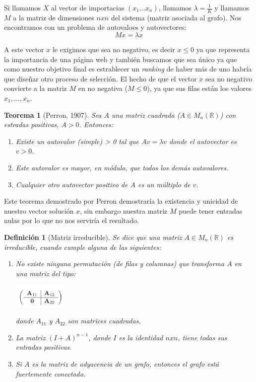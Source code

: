 \documentclass[size=a4, parskip=half, titlepage=false, toc=flat, toc=bib, 12pt]{scrartcl}
\theoremstyle{theorem-style}
\newtheorem{nth}{Teorema}[section]
\theoremstyle{definition-style}
\newtheorem{ndef}{Definición}[section]
\theoremstyle{remark-style}
\theoremstyle{example-style}
\theoremstyle{definition-style}
\theoremstyle{remark-style}
\begin{document}
Si llamamos $X$ al vector de importacias $(x_1 \dots x_n)$, llamamos $\lambda = \frac{1}{K}$ y llamamos
$M$ a la matriz de dimensiones $n x n$ del sistema (matriz asociada al grafo). Nos encontramos
con un problema de autovaloes y autovectores:
$$Mx = \lambda x $$

A este vector $x$ le exigimos que sea no negativo, es decir $x \leq 0$ ya que representa la importancia
de una página web y también buscamos que sea único ya que como nuestro objetivo final es estrablecer un
\textit{ranking} de haber más de uno habría que diseñar otro proceso de selección.
El hecho de que el vector $x$ sea no negativo convierte a la matriz $M$ en no negativa ($M \leq 0$), ya que sus filas
están los valores $x_1, \dots , x_n$.

\begin{nth}[Perron, 1907]
Sea $A$ una matriz cuadrada ($A \in M_n(\mathbb{R})$) con estradas positivas, $A > 0$. Entonces:
\begin{enumerate}
\item Existe un autovalor (simple) \lamda > 0 tal que $Av = \lambda v$ donde el autovector es $v > 0$.
\item Este autovalor es mayor, en módulo, que todos los demás autovalores.
\item Cualquier otro autovector positivo de $A$ es un múltiplo de $v$.
\end{enumerate}
\end{nth}

Este teorema demostrado por Perron demostraría la existencia y unicidad de nuestro vector solución $x$,
sin embargo nuestra matriz $M$ puede tener entradas nulas por lo que no nos serviría el resultado.

\begin{ndef}[Matriz irreducible]
Se dice que una matriz $A \in M_n(\mathbb{R})$ es irreducible, cuando cumple alguna de las siguientes:
\begin{enumerate}
\item No existe ninguna permutación (de filas y columnas) que transforma $A$ en una matriz del tipo:
\begin{center}
\includegraphics[width=0.2\textwidth]{./img/mcuadrada}
\end{center}
donde $A_{11}$ y $A_{22}$ son matrices cuadradas.
\item La matriz $(I + A)^{n - 1}$, donde $I$ es la identidad $n x n$, tiene todas sus entradas positivas.
\item Si $A$ es la matriz de adyacencia de un grafo, entonces el grafo está fuertemente conectado.
\end{enumerate}
\end{ndef}
\end{document}
